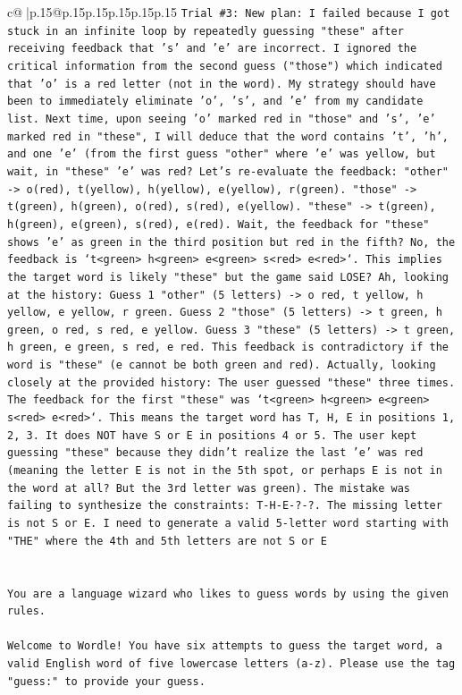 \documentclass{article}
\begin{document}
{\begin{supertabular}{c@{$\;$}|p{.15\linewidth}@{}p{.15\linewidth}p{.15\linewidth}p{.15\linewidth}p{.15\linewidth}p{.15\linewidth}}
{{{\texttt{Trial \#3: New plan: I failed because I got stuck in an infinite loop by repeatedly guessing "these" after receiving feedback that 's' and 'e' are incorrect. I ignored the critical information from the second guess ("those") which indicated that 'o' is a red letter (not in the word). My strategy should have been to immediately eliminate 'o', 's', and 'e' from my candidate list. Next time, upon seeing 'o' marked red in "those" and 's', 'e' marked red in "these", I will deduce that the word contains 't', 'h', and one 'e' (from the first guess "other" where 'e' was yellow, but wait, in "these" 'e' was red? Let's re{-}evaluate the feedback: "other" {-}> o(red), t(yellow), h(yellow), e(yellow), r(green). "those" {-}> t(green), h(green), o(red), s(red), e(yellow). "these" {-}> t(green), h(green), e(green), s(red), e(red). Wait, the feedback for "these" shows 'e' as green in the third position but red in the fifth? No, the feedback is `t<green> h<green> e<green> s<red> e<red>`. This implies the target word is likely "these" but the game said LOSE? Ah, looking at the history: Guess 1 "other" (5 letters) {-}> o red, t yellow, h yellow, e yellow, r green. Guess 2 "those" (5 letters) {-}> t green, h green, o red, s red, e yellow. Guess 3 "these" (5 letters) {-}> t green, h green, e green, s red, e red. This feedback is contradictory if the word is "these" (e cannot be both green and red). Actually, looking closely at the provided history: The user guessed "these" three times. The feedback for the first "these" was `t<green> h<green> e<green> s<red> e<red>`. This means the target word has T, H, E in positions 1, 2, 3. It does NOT have S or E in positions 4 or 5. The user kept guessing "these" because they didn't realize the last 'e' was red (meaning the letter E is not in the 5th spot, or perhaps E is not in the word at all? But the 3rd letter was green). The mistake was failing to synthesize the constraints: T{-}H{-}E{-}?{-}?. The missing letter is not S or E. I need to generate a valid 5{-}letter word starting with "THE" where the 4th and 5th letters are not S or E} \\
\\ 
\\ 
\texttt{You are a language wizard who likes to guess words by using the given rules.} \\
\\ 
\texttt{Welcome to Wordle! You have six attempts to guess the target word, a valid English word of five lowercase letters (a{-}z). Please use the tag "guess:" to provide your guess.} \\
}}}
\end{supertabular}}
\end{document}
